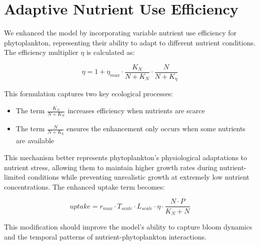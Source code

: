 \section{Adaptive Nutrient Use Efficiency}

We enhanced the model by incorporating variable nutrient use efficiency for phytoplankton, representing their ability to adapt to different nutrient conditions. The efficiency multiplier $\eta$ is calculated as:

\[ \eta = 1 + \eta_{max} \cdot \frac{K_N}{N + K_N} \cdot \frac{N}{N + K_\eta} \]

This formulation captures two key ecological processes:
\begin{itemize}
    \item The term $\frac{K_N}{N + K_N}$ increases efficiency when nutrients are scarce
    \item The term $\frac{N}{N + K_\eta}$ ensures the enhancement only occurs when some nutrients are available
\end{itemize}

This mechanism better represents phytoplankton's physiological adaptations to nutrient stress, allowing them to maintain higher growth rates during nutrient-limited conditions while preventing unrealistic growth at extremely low nutrient concentrations. The enhanced uptake term becomes:

\[ uptake = r_{max} \cdot T_{scale} \cdot L_{scale} \cdot \eta \cdot \frac{N \cdot P}{K_N + N} \]

This modification should improve the model's ability to capture bloom dynamics and the temporal patterns of nutrient-phytoplankton interactions.
